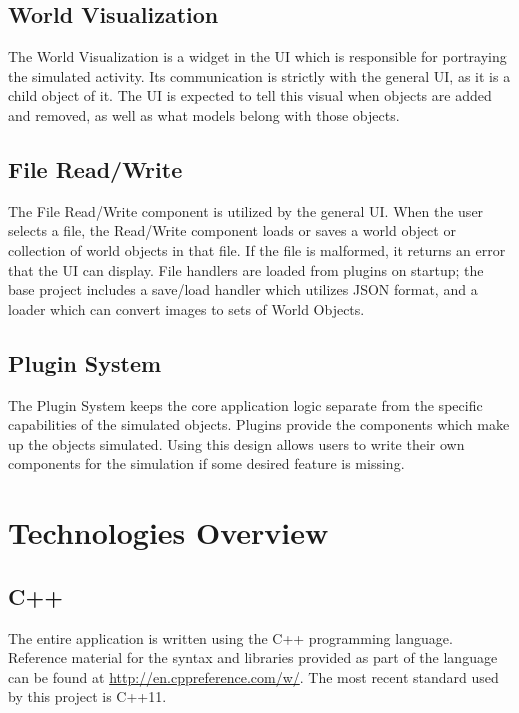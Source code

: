 \subsection{World Visualization}
The World Visualization is a widget in the UI which is responsible for portraying the simulated activity. Its communication is strictly with the general UI, as it is a child object of it. The UI is expected to tell this visual when objects are added and removed, as well as what models belong with those objects.

\subsection{File Read/Write}
The File Read/Write component is utilized by the general UI. When the user selects a file, the Read/Write component loads or saves a world object or collection of world objects in that file. If the file is malformed, it returns an error that the UI can display. File handlers are loaded from plugins on startup; the base project includes a save/load handler which utilizes JSON format, and a loader which can convert images to sets of World Objects.

\subsection{Plugin System}
The Plugin System keeps the core application logic separate from the specific capabilities of the simulated objects. Plugins provide the components which make up the objects simulated. Using this design allows users to write their own components for the simulation if some desired feature is missing.

\section{Technologies Overview}
\subsection{C++}
	The entire application is written using the C++ programming language. Reference material for the syntax and libraries provided as part of the language can be found at \url{http://en.cppreference.com/w/}. The most recent standard used by this project is C++11.
	
